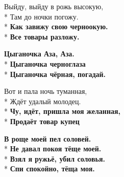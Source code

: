 \medskip

\begin{minipage}{\linewidth}
Выйду, выйду в рожь высокую,\\*
Там до ночки погожу.\\*
\textbf{Как завижу свою черноокую.}\\*
\textbf{Все товары разложу.}\\
\end{minipage}\par\medskip\nobreak

\medskip

\begin{minipage}{\linewidth}
\hspace*{1.5em}\textbf{Цыганочка Аза, Аза.}\\*
\hspace*{1.5em}\textbf{Цыганочка черноглаза}\\*
\hspace*{1.5em}\textbf{Цыганочка чёрная, погадай.}\\
\end{minipage}\par\medskip\nobreak

\medskip

\begin{minipage}{\linewidth}
Вот и пала ночь туманная,\\*
Ждёт удалый молодец.\\*
\textbf{Чу, идёт, пришла моя желанная,}\\*
\textbf{Продаёт товар купец}\\
\end{minipage}\par\medskip\nobreak

\medskip

\begin{minipage}{\linewidth}
\hspace*{1.5em}\textbf{В роще моей пел соловей.}\\*
\hspace*{1.5em}\textbf{Не давал покоя тёще моей.}\\*
\hspace*{1.5em}\textbf{Взял я ружьё, убил соловья.}\\*
\hspace*{1.5em}\textbf{Спи спокойно, тёща моя.}\\
\end{minipage}\par\medskip\nobreak

\medskip

